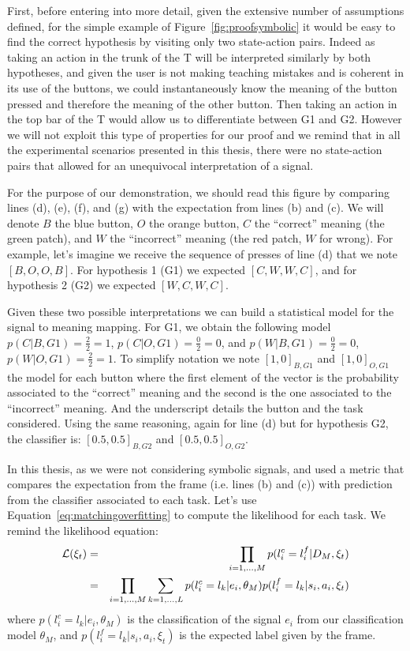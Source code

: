 First, before entering into more detail, given the extensive number of assumptions defined, for the simple example of Figure~\ref{fig:proofsymbolic} it would be easy to find the correct hypothesis by visiting only two state-action pairs. Indeed as taking an action in the trunk of the T will be interpreted similarly by both hypotheses, and given the user is not making teaching mistakes and is coherent in its use of the buttons, we could instantaneously know the meaning of the button pressed and therefore the meaning of the other button. Then taking an action in the top bar of the T would allow us to differentiate between G1 and G2. However we will not exploit this type of properties for our proof and we remind that in all the experimental scenarios presented in this thesis, there were no state-action pairs that allowed for an unequivocal interpretation of a signal.

For the purpose of our demonstration, we should read this figure by comparing lines (d), (e), (f), and (g) with the expectation from lines (b) and (c). We will denote $B$ the blue button, $O$ the orange button, $C$ the ``correct'' meaning (the green patch), and $W$ the ``incorrect'' meaning (the red patch, $W$ for wrong). For example, let's imagine we receive the sequence of presses of line (d) that we note $[B,O,O,B]$. For hypothesis 1 (G1) we expected $[C,W,W,C]$, and for hypothesis 2 (G2) we expected $[W,C,W,C]$. 

Given these two possible interpretations we can build a statistical model for the signal to meaning mapping. For G1, we obtain the following model $p(C|B, G1) = \frac{2}{2} = 1$, $p(C|O, G1) = \frac{0}{2} = 0$, and $p(W|B, G1) = \frac{0}{2} = 0$, $p(W|O, G1) = \frac{2}{2} = 1$. To simplify notation we note $[1,0]_{B,G1}$ and $[1,0]_{O,G1}$ the model for each button where the first element of the vector is the probability associated to the ``correct'' meaning and the second is the one associated to the ``incorrect'' meaning. And the underscript details the button and the task considered. Using the same reasoning, again for line (d) but for hypothesis G2, the classifier is: $[0.5,0.5]_{B,G2}$ and $[0.5,0.5]_{O,G2}$.

In this thesis, as we were not considering symbolic signals, and used a metric that compares the expectation from the frame (i.e. lines (b) and (c)) with prediction from the classifier associated to each task. Let's use Equation~\ref{eq:matchingoverfitting} to compute the likelihood for each task. We remind the likelihood equation:
%
\begin{eqnarray}
\mathcal{L}(\xi_t) &=& \prod_{i = 1,\ldots,M} p(l^c_i = l^f_i | D_M, \xi_t) \nonumber \\ 
&=& \prod_{i = 1,\ldots,M} \sum_{k = 1, \ldots, L} p(l^c_i = l_k | e_i, \theta_M) p(l^f_i = l_k | s_i, a_i, \xi_t) \nonumber
\end{eqnarray}
%
where $p(l^c_i = l_k | e_i, \theta_M)$ is the classification of the signal $e_i$ from our classification model $\theta_M$, and $p(l^f_i = l_k | s_i, a_i, \xi_t)$ is the expected label given by the frame.

